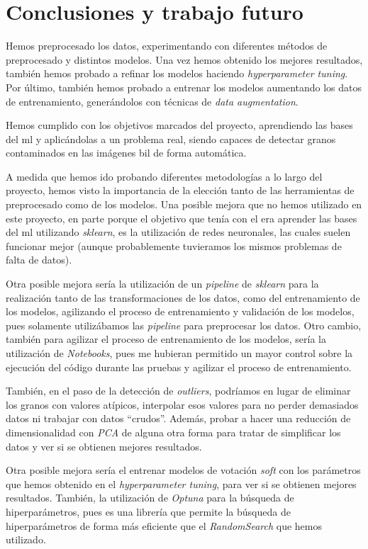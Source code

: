 \section{Conclusiones y trabajo futuro}

Hemos preprocesado los datos, experimentando con diferentes métodos de preprocesado y distintos modelos. Una vez hemos obtenido los mejores resultados, también hemos probado a refinar los modelos haciendo \textit{hyperparameter tuning}. Por último, también hemos probado a entrenar los modelos aumentando los datos de entrenamiento, generándolos con técnicas de \textit{data augmentation}.

Hemos cumplido con los objetivos marcados del proyecto, aprendiendo las bases del \gls{ml} y aplicándolas a un problema real, siendo capaces de detectar granos contaminados en las imágenes \gls{bil} de forma automática.

A medida que hemos ido probando diferentes metodologías a lo largo del proyecto, hemos visto la importancia de la elección tanto de las herramientas de preprocesado como de los modelos.
Una posible mejora que no hemos utilizado en este proyecto, en parte porque el objetivo que tenía con el era aprender las bases del \gls{ml} utilizando \textit{sklearn}, es la utilización de redes neuronales, las cuales suelen funcionar mejor (aunque probablemente tuvieramos los mismos problemas de falta de datos).

Otra posible mejora sería la utilización de un \textit{pipeline} de \textit{sklearn} para la realización tanto de las transformaciones de los datos, como del entrenamiento de los modelos, agilizando el proceso de entrenamiento y validación de los modelos, pues solamente utilizábamos las \textit{pipeline} para preprocesar los datos.
Otro cambio, también para agilizar el proceso de entrenamiento de los modelos, sería la utilización de \textit{Notebooks}, pues me hubieran permitido un mayor control sobre la ejecución del código durante las pruebas y agilizar el proceso de entrenamiento.

También, en el paso de la detección de \textit{outliers}, podríamos en lugar de eliminar los granos con valores atípicos, interpolar esos valores para no perder demasiados datos ni trabajar con datos ``crudos''. Además, probar a hacer una reducción de dimensionalidad con \textit{PCA} de alguna otra forma para tratar de simplificar los datos y ver si se obtienen mejores resultados.

Otra posible mejora sería el entrenar modelos de votación \textit{soft} con los parámetros que hemos obtenido en el \textit{hyperparameter tuning}, para ver si se obtienen mejores resultados. También, la utilización de \textit{Optuna} para la búsqueda de hiperparámetros, pues es una librería que permite la búsqueda de hiperparámetros de forma más eficiente que el \textit{RandomSearch} que hemos utilizado.